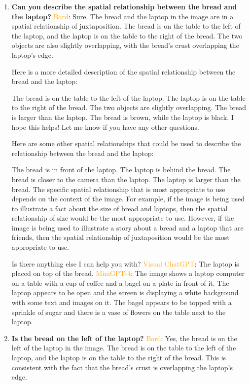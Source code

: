     \begin{enumerate}
        \item \textbf{Can you describe the spatial relationship between the bread and the laptop?}
        \subitem \textcolor{orange}{Bard}:
        Sure. The bread and the laptop in the image are in a spatial relationship of juxtaposition. The bread is on the table to the left of the laptop, and the laptop is on the table to the right of the bread. The two objects are also slightly overlapping, with the bread's crust overlapping the laptop's edge.

        Here is a more detailed description of the spatial relationship between the bread and the laptop:

        The bread is on the table to the left of the laptop.
        The laptop is on the table to the right of the bread.
        The two objects are slightly overlapping.
        The bread is larger than the laptop.
        The bread is brown, while the laptop is black.
        I hope this helps! Let me know if you have any other questions.

        Here are some other spatial relationships that could be used to describe the relationship between the bread and the laptop:

        The bread is in front of the laptop.
        The laptop is behind the bread.
        The bread is closer to the camera than the laptop.
        The laptop is larger than the bread.
        The specific spatial relationship that is most appropriate to use depends on the context of the image. For example, if the image is being used to illustrate a fact about the size of bread and laptops, then the spatial relationship of size would be the most appropriate to use. However, if the image is being used to illustrate a story about a bread and a laptop that are friends, then the spatial relationship of juxtaposition would be the most appropriate to use.

        Is there anything else I can help you with?
        \subitem \textcolor{orange}{Visual ChatGPT}: The laptop is placed on top of the bread.
        \subitem \textcolor{orange}{MiniGPT-4}: The image shows a laptop computer on a table with a cup of coffee and a bagel on a plate in front of it. The laptop appears to be open and the screen is displaying a white background with some text and images on it. The bagel appears to be topped with a sprinkle of sugar and there is a vase of flowers on the table next to the laptop.
        \item \textbf{Is the bread on the left of the laptop?}
        \subitem \textcolor{orange}{Bard}: Yes, the bread is on the left of the laptop in the image. The bread is on the table to the left of the laptop, and the laptop is on the table to the right of the bread. This is consistent with the fact that the bread's crust is overlapping the laptop's edge.


\end{enumerate}
